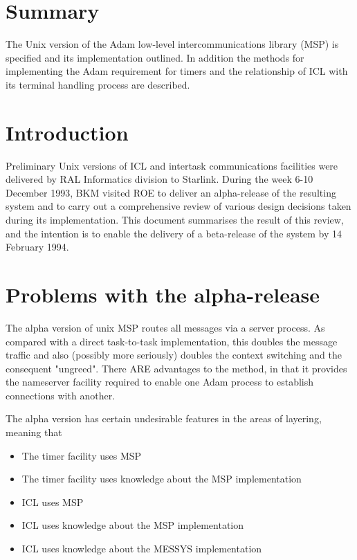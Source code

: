 \section {Summary}

The Unix version of the Adam low-level intercommunications library (MSP)
is specified and its implementation outlined. In addition the methods
for implementing the Adam requirement for timers and the relationship of
ICL with its terminal handling process are described.


\section {Introduction}

Preliminary Unix versions of ICL and intertask communications facilities
were delivered by RAL Informatics division to Starlink. During the week
6-10 December 1993, BKM visited ROE to deliver an alpha-release of the
resulting system and to carry out a comprehensive review of various
design decisions taken during its implementation. This document
summarises the result of this review, and the intention is to enable the
delivery of a beta-release of the system by 14 February 1994.

\section {Problems with the alpha-release}

The alpha version of unix MSP routes all messages via a server process.
As compared with a direct task-to-task implementation, this doubles the
message traffic and also (possibly more seriously) doubles the context
switching and the consequent "ungreed". There ARE advantages to the
method, in that it provides the nameserver facility required to enable
one Adam process to establish connections with another.

The alpha version has certain undesirable features in the areas of
layering, meaning that

\begin{itemize}
\item The timer facility uses MSP
\item The timer facility uses knowledge about the MSP implementation
\item ICL uses MSP
\item ICL uses knowledge about the MSP implementation
\item ICL uses knowledge about the MESSYS implementation
\end{itemize}


